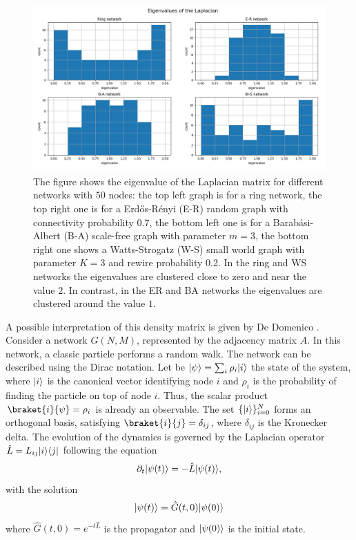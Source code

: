 \begin{figure}[ht!]
    \centering
    \includegraphics[width=\textwidth]{image/eigenvalue_distribution.png}
    \caption{The figure shows the eigenvalue of the Laplacian matrix for different networks with $50$ nodes: the top left graph is for a ring network, the top right one is for a Erd\H{o}s-Rényi (E-R) random graph with connectivity probability $0.7$, the bottom left one is for a Barab\'asi-Albert (B-A) scale-free graph with parameter $m=3$, the bottom right one shows a Watts-Strogatz (W-S) small world graph with parameter $K=3$ and rewire probability 0.2. In the ring and WS networks the eigenvalues are clustered close to zero and near the value $2$. In contrast, in the ER and BA networks the eigenvalues are clustered around the value $1$.}
    \label{Fig:eigen_distribution}
\end{figure}



A possible interpretation of this density matrix is given by De Domenico \cite{De_Domenico_2020}.
Consider a network $G(N,M)$, represented by the adjacency matrix $A$. In this network, a classic particle performs a random walk. 
The network can be described using the Dirac notation. Let be $\lvert\psi\rangle = \sum_i \rho_i \lvert i\rangle$ the state of the system, where $\lvert i\rangle$ is the canonical vector identifying node $i$ and $\rho_i$ is the probability of finding the particle on top of node $i$. Thus, the scalar product $\braket{i}{\psi} = \rho_i$ is already an observable. The set $\{\lvert i\rangle\}_{i=0}^N$ forms an orthogonal basis, satisfying $\braket{i}{j} = \delta_{ij}$, where $\delta_{ij}$ is the Kronecker delta. 
The evolution of the dynamics is governed by the Laplacian operator $\hat L = L_{ij} \lvert i\rangle\langle j\rvert$ following the equation
\begin{equation} \label{time_evolution}
    \partial_t \lvert\psi(t)\rangle = - \hat L \lvert\psi(t)\rangle,
\end{equation}
with the solution
\begin{equation}
    \lvert\psi(t)\rangle = \hat G(t,0) \lvert\psi(0)\rangle
\end{equation}
where $\hat G(t,0) = e^{-t\hat L}$ is the propagator and $\lvert\psi(0)\rangle$ is the initial state. 

